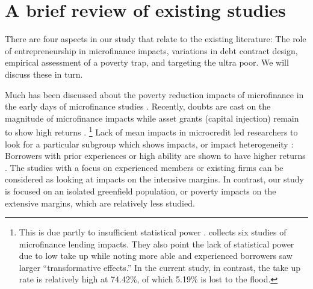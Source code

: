 \section{A brief review of existing studies}
\label{SecExistingStudies}

	There are four aspects in our study that relate to the existing literature: The role of entrepreneurship in microfinance impacts, variations in debt contract design, empirical assessment of a poverty trap, and targeting the ultra poor. We will discuss these in turn.

	Much has been discussed about the poverty reduction impacts of microfinance in the early days of microfinance studies \citep{PittKhandker1998, Morduch1999}. Recently, doubts are cast on the magnitude of microfinance impacts \citep{BanerjeeKarlanZinman2015, DuvendackMader2019, Meager2019} while asset grants (capital injection) remain to show high returns \citep{deMel2008, DeMel2014, FafchampsFlypaper2014, BandieraBRAC2017}. \footnote{This is due partly to insufficient statistical power \citep{MckenzieWoodruff2013}. \citet{BanerjeeKarlanZinman2015} collects six studies of microfinance lending impacts. They also point the lack of statistical power due to low take up while noting more able and experienced borrowers saw larger ``transformative effects.'' %
	In the current study, in contrast, the take up rate is relatively high at 74.42\%, of which 5.19\% is lost to the flood.  } Lack of mean impacts in microcredit led researchers to look for a particular subgroup which shows impacts, or impact heterogeneity \citep{Banerjee2017HyderabadFollowup}: Borrowers with prior experiences or high ability are shown to have higher returns \citep{Banerjee2015Miracle, Mckenzie2017Spurring, Buera2017, Banerjee2019MFPovertyTrap}. The studies with a focus on experienced members or existing firms can be considered as looking at impacts on the intensive margins. In contrast, our study is focused on an isolated greenfield population, or poverty impacts on the extensive margins, which are relatively less studied.

